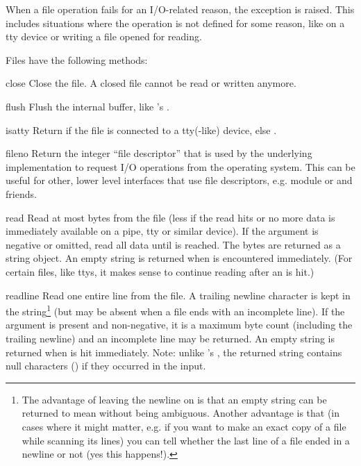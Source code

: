 When a file operation fails for an I/O-related reason, the exception
 is raised.  This includes situations where the
operation is not defined for some reason, like  on a tty
device or writing a file opened for reading.

Files have the following methods:


\begin{methoddesc}[file]{close}{}
  Close the file.  A closed file cannot be read or written anymore.
\end{methoddesc}

\begin{methoddesc}[file]{flush}{}
  Flush the internal buffer, like 's .
\end{methoddesc}

\begin{methoddesc}[file]{isatty}{}
  Return  if the file is connected to a tty(-like) device, else
  .
\end{methoddesc}

\begin{methoddesc}[file]{fileno}{}
Return the integer ``file descriptor'' that is used by the underlying
implementation to request I/O operations from the operating system.
This can be useful for other, lower level interfaces that use file
descriptors, e.g. module  or  and friends.
\end{methoddesc}

\begin{methoddesc}[file]{read}{}
  Read at most  bytes from the file (less if the read hits
  \EOF{} or no more data is immediately available on a pipe, tty or
  similar device).  If the  argument is negative or omitted,
  read all data until \EOF{} is reached.  The bytes are returned as a string
  object.  An empty string is returned when \EOF{} is encountered
  immediately.  (For certain files, like ttys, it makes sense to
  continue reading after an \EOF{} is hit.)
\end{methoddesc}

\begin{methoddesc}[file]{readline}{}
  Read one entire line from the file.  A trailing newline character is
  kept in the string\footnote{
	The advantage of leaving the newline on is that an empty string 
	can be returned to mean \EOF{} without being ambiguous.  Another 
	advantage is that (in cases where it might matter, e.g. if you 
	want to make an exact copy of a file while scanning its lines) 
	you can tell whether the last line of a file ended in a newline
	or not (yes this happens!).}
  (but may be absent when a file ends with an
  incomplete line).  If the  argument is present and
  non-negative, it is a maximum byte count (including the trailing
  newline) and an incomplete line may be returned.
  An empty string is returned when \EOF{} is hit
  immediately.  Note: unlike 's , the returned
  string contains null characters () if they occurred in the
  input.
\end{methoddesc}

